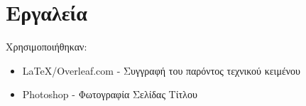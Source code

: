 \documentclass{article}
\begin{document}
\section{Εργαλεία}
Χρησιμοποιήθηκαν:
\begin{itemize}
    \item \LaTeX/Overleaf.com - Συγγραφή του παρόντος τεχνικού κειμένου
    \item Photoshop - Φωτογραφία Σελίδας Τίτλου
    
\end{itemize}
\end{document}
